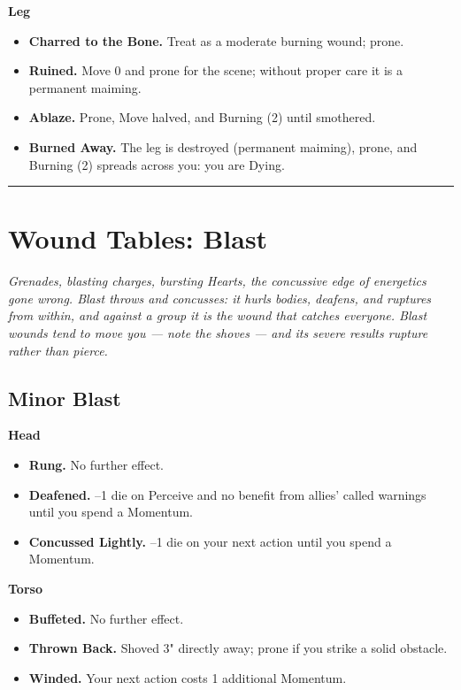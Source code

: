 \textbf{Leg}
\begin{itemize}
    \item[1] \textbf{Charred to the Bone.} Treat as a moderate burning wound; prone.
    \item[2] \textbf{Ruined.} Move 0 and prone for the scene; without proper care it is a permanent maiming.
    \item[3] \textbf{Ablaze.} Prone, Move halved, and Burning (2) until smothered.
    \item[4] \textbf{Burned Away.} The leg is destroyed (permanent maiming), prone, and Burning (2) spreads across you: you are Dying.
\end{itemize}

\medskip\hrule\medskip

\section{Wound Tables: Blast}

\textit{Grenades, blasting charges, bursting Hearts, the concussive edge of energetics gone wrong. Blast throws and concusses: it hurls bodies, deafens, and ruptures from within, and against a group it is the wound that catches everyone. Blast wounds tend to move you --- note the shoves --- and its severe results rupture rather than pierce.}

\subsection{Minor Blast}

\textbf{Head}
\begin{itemize}
    \item[1--2] \textbf{Rung.} No further effect.
    \item[3] \textbf{Deafened.} --1 die on Perceive and no benefit from allies' called warnings until you spend a Momentum.
    \item[4] \textbf{Concussed Lightly.} --1 die on your next action until you spend a Momentum.
\end{itemize}

\textbf{Torso}
\begin{itemize}
    \item[1--2] \textbf{Buffeted.} No further effect.
    \item[3] \textbf{Thrown Back.} Shoved 3" directly away; prone if you strike a solid obstacle.
    \item[4] \textbf{Winded.} Your next action costs 1 additional Momentum.
\end{itemize}


